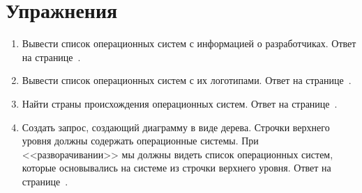 \section{Упражнения}
\label{tasks:operating_system_tasks}
\begin{enumerate}
	\item Вывести список операционных систем с информацией о разработчиках. Ответ на странице~\pageref{answer:os_and_developers}.
	\item Вывести список операционных систем с их логотипами. Ответ на странице~\pageref{answer:os_and_logos}.
	\item Найти страны происхождения операционных систем. Ответ на странице~\pageref{answer:os_country}.
	\item Создать запрос, создающий диаграмму в виде дерева. 
        Строчки верхнего уровня должны содержать операционные системы. 
        При <<разворачивании>> мы должны видеть список операционных систем, 
        которые основывались на системе из строчки верхнего уровня. 
        Ответ на странице~\pageref{answer:os_and_bases}.
\end{enumerate}
